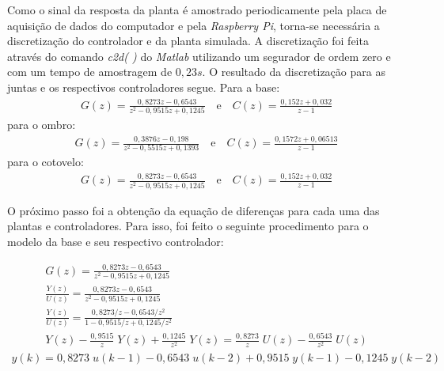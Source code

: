 Como o sinal da resposta da planta é amostrado periodicamente pela placa de aquisição de dados do
computador e pela \textit{Raspberry Pi}, torna-se necessária a discretização do controlador e da planta simulada. A 
discretização foi feita através do comando \textit{c2d( )} do \textit{Matlab} utilizando um segurador de 
ordem zero e com um tempo de amostragem de $0,23s$. O resultado da discretização para as juntas e os respectivos
controladores segue.
Para a base:
\begin{equation}
  \begin{gathered}
    G(z) = \frac{0,8273z - 0,6543}{z^2 - 0,9515z + 0,1245} \quad \text{e} \quad C(z) = \frac{0,152z + 0,032}{z - 1}
  \end{gathered}
  \label{eq:base_discrete}
\end{equation}
para o ombro:
\begin{equation}
  \begin{gathered}
    G(z) = \frac{0,3876z - 0,198}{z^2 - 0,5515z + 0,1393} \quad \text{e} \quad C(z) = \frac{0,1572z + 0,06513}{z - 1}
  \end{gathered}
  \label{eq:shoulder_discrete}
\end{equation}
para o cotovelo:
\begin{equation}
  \begin{gathered}
   G(z) = \frac{0,8273z - 0,6543}{z^2 - 0,9515z + 0,1245} \quad \text{e} \quad C(z) = \frac{0,152z + 0,032}{z - 1}
  \end{gathered}
  \label{eq:forearm_discrete}
\end{equation}

O próximo passo foi a obtenção da equação de diferenças para cada uma das plantas e
controladores. Para isso, foi feito o seguinte procedimento para o modelo da base e seu respectivo controlador:

\begin{equation*}
  \begin{gathered}
    G(z) = \frac{0,8273z - 0,6543}{z^2 - 0,9515z + 0,1245} \\[0.5cm]
    \frac{Y(z)}{U(z)} = \frac{0,8273z - 0,6543}{z^2 - 0,9515z + 0,1245}\\[0.5cm]
    \frac{Y(z)}{U(z)} = \frac{0,8273/z - 0,6543/z^2}{1 - 0,9515/z + 0,1245/z^2}\\[0.5cm]
    Y(z) - \frac{0,9515}{z} \;Y(z) + \frac{0,1245}{z^2} \;Y(z) = \frac{0,8273}{z} \;U(z) - \frac{0,6543}{z^2} \;U(z)
  \end{gathered}
  \label{eq:base_plant_diffEqIntro}
\end{equation*}
\begin{equation}
  \begin{gathered}
    y(k) = 0,8273 \;u(k-1) - 0,6543 \;u(k-2) + 0,9515 \;y(k-1) - 0,1245 \;y(k-2)
  \end{gathered}
  \label{eq:base_plant_diffEq}
\end{equation}

